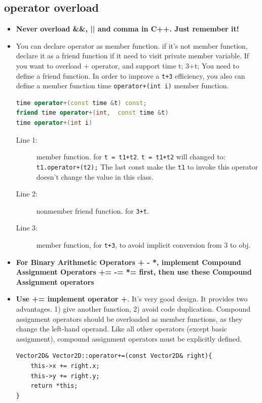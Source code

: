 \documentclass[a4paper,11pt,twoside]{book}
\begin{document}
\subsection{operator overload}
\begin{itemize}
	\item \textbf{Never overload \&\&, || and comma in C++.  Just remember it!}
	
	\item You can declare operator as member function. if it's not member function, declare it as a friend function if it need to visit private member variable. If you want to overload + operator, and support time t; 3+t;   You need to define a friend function. In order to improve a \texttt{t+3} efficiency, you also can define a member function time \texttt{operator+(int i)} member function.
\begin{lstlisting}[frame=single, language=c++]
time operator+(const time &t) const;
friend time operator+(int,  const time &t)
time operator+(int i)
\end{lstlisting}
\begin{description}
	\item[Line 1:] member function. for \texttt{t = t1+t2}. \texttt{t = t1+t2} will changed to:  \texttt{t1.operator+(t2);}  The last const make the \texttt{t1} to invoke this operator doesn't change the value in this class. 
	
	\item[Line 2:] nonmember friend function. for \texttt{3+t}.
	
	\item[Line 3:] member function, for \texttt{t+3}, to avoid implicit conversion from 3 to obj.
\end{description}
	
	\item \textbf{For Binary Arithmetic Operators + - *, implement Compound Assignment Operators += -= *= first, then use these Compound Assignment operators}
	
	\item \textbf{Use += implement operator +}. It's very good design. It provides two advantages. 1) give another function, 2) avoid code duplication. Compound assignment operators should be overloaded as member functions, as they change the left-hand operand. Like all other operators (except basic assignment), compound assignment operators must be explicitly defined. 
\begin{lstlisting}[numbers=none]
Vector2D& Vector2D::operator+=(const Vector2D& right){
	this->x += right.x;
	this->y += right.y;
	return *this;
}
\end{lstlisting}
	

\end{itemize}
\end{document}
